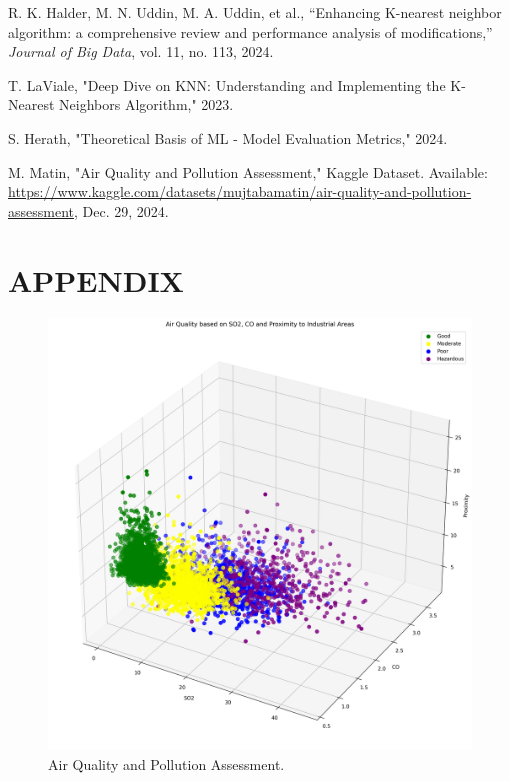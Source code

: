 \documentclass[10pt,twocolumn]{article}
\begin{document}
\begin{thebibliography}{99}
R. K. Halder, M. N. Uddin, M. A. Uddin, et al., “Enhancing K-nearest neighbor algorithm: a comprehensive review and performance analysis of modifications,” \emph{Journal of Big Data}, vol. 11, no. 113, 2024.

T. LaViale, "Deep Dive on KNN: Understanding and Implementing the K-Nearest Neighbors Algorithm," 2023.

S. Herath, "Theoretical Basis of ML - Model Evaluation Metrics," 2024.

M. Matin, "Air Quality and Pollution Assessment," Kaggle Dataset. Available: \url{https://www.kaggle.com/datasets/mujtabamatin/air-quality-and-pollution-assessment}, Dec. 29, 2024.


\end{thebibliography}

\appendix
\onecolumn %
\section*{APPENDIX}

\begin{figure}[h!]
    \centering
    \includegraphics[width=\linewidth]{plot.png}
    \caption{{Air Quality and Pollution Assessment.}}
    \label{fig:airqual}
\end{figure}
\end{document}
